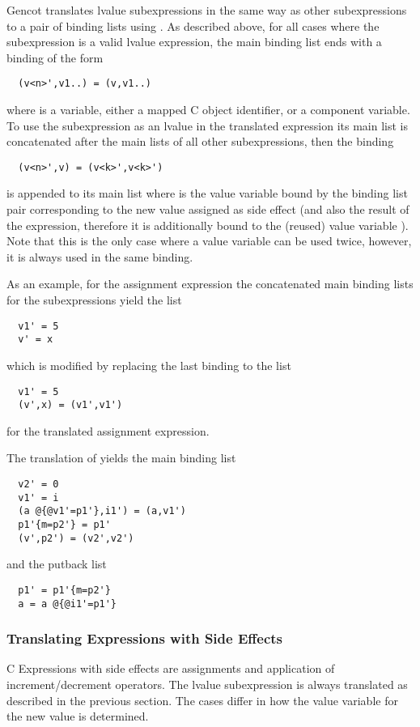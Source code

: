 Gencot translates lvalue subexpressions in the same way as other subexpressions to a pair of binding lists using .
As described above, for all cases where the subexpression is a valid lvalue expression, the main binding list ends with a binding
of the form
\begin{verbatim}
  (v<n>',v1..) = (v,v1..)
\end{verbatim}
where  is a variable, either a mapped C object identifier, or a component variable. To use the subexpression as an lvalue
in the translated expression its main list is concatenated after the main lists of all other subexpressions, then the binding
\begin{verbatim}
  (v<n>',v) = (v<k>',v<k>')
\end{verbatim}
is appended to its main list
where  is the value variable bound by the binding list pair corresponding to the new value assigned as side effect
(and also the result of the expression, therefore it is additionally bound to the (reused) value variable ). 
Note that this is the only case where a value variable can be used twice, however, it is always used in the same binding.

As an example, for the assignment expression  the concatenated main binding lists for the subexpressions yield the
list 
\begin{verbatim}
  v1' = 5
  v' = x
\end{verbatim}
which is modified by replacing the last binding to the list
\begin{verbatim}
  v1' = 5
  (v',x) = (v1',v1')
\end{verbatim}
for the translated assignment expression.

The translation of  yields the main binding list
\begin{verbatim}
  v2' = 0
  v1' = i
  (a @{@v1'=p1'},i1') = (a,v1')
  p1'{m=p2'} = p1'
  (v',p2') = (v2',v2')
\end{verbatim}
and the putback list
\begin{verbatim}
  p1' = p1'{m=p2'}
  a = a @{@i1'=p1'}
\end{verbatim}

\subsubsection{Translating Expressions with Side Effects}

C Expressions with side effects are assignments and application of increment/decrement operators. The lvalue subexpression is always 
translated as described in the previous section. The cases differ in how the value variable  for the new value is 
determined.

